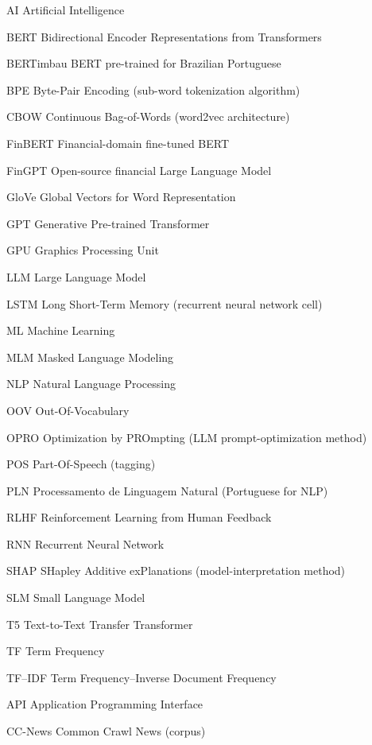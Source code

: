\begin{siglas}
    \item[AI] Artificial Intelligence
    \item[BERT] Bidirectional Encoder Representations from Transformers
    \item[BERTimbau] BERT pre-trained for Brazilian Portuguese
    \item[BPE] Byte-Pair Encoding (sub-word tokenization algorithm)
    \item[CBOW] Continuous Bag-of-Words (word2vec architecture)
    \item[FinBERT] Financial-domain fine-tuned BERT
    \item[FinGPT] Open-source financial Large Language Model
    \item[GloVe] Global Vectors for Word Representation
    \item[GPT] Generative Pre-trained Transformer
    \item[GPU] Graphics Processing Unit
    \item[LLM] Large Language Model
    \item[LSTM] Long Short-Term Memory (recurrent neural network cell)
    \item[ML] Machine Learning
    \item[MLM] Masked Language Modeling
    \item[NLP] Natural Language Processing
    \item[OOV] Out-Of-Vocabulary
    \item[OPRO] Optimization by PROmpting (LLM prompt-optimization method)
    \item[POS] Part-Of-Speech (tagging)
    \item[PLN] Processamento de Linguagem Natural (Portuguese for NLP)
    \item[RLHF] Reinforcement Learning from Human Feedback
    \item[RNN] Recurrent Neural Network
    \item[SHAP] SHapley Additive exPlanations (model-interpretation method)
    \item[SLM] Small Language Model
    \item[T5] Text-to-Text Transfer Transformer
    \item[TF] Term Frequency
    \item[TF--IDF] Term Frequency--Inverse Document Frequency
    \item[API] Application Programming Interface
    \item[CC-News] Common Crawl News (corpus)

\end{siglas}
